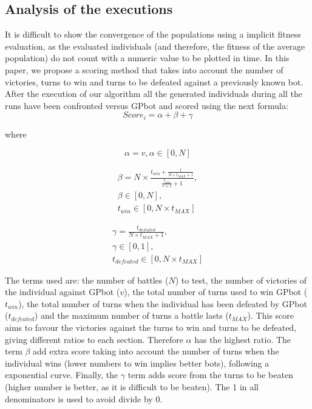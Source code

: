 \documentclass[conference]{IEEEtran}
\begin{document}
\subsection{Analysis of the executions}   %
\label{subsec:analysisexecutions}

It is difficult to show the convergence of the populations using a implicit fitness evaluation, as the evaluated individuals (and therefore, the fitness of the average population) do not count with a numeric value to be plotted in time. In this paper, we propose a scoring method that takes into account the number of victories, turns to win and turns to be defeated %
 against a previously known bot. After the execution of our algorithm all the generated individuals during all the runs have been confronted versus GPbot \cite{GarciaGP14} and scored using the next formula:
\begin{equation}
Score_{i}=\alpha+\beta+\gamma
\end{equation}

where

\begin{equation}
\alpha  = v, \alpha \in\left[0,N\right]
\end{equation}

\begin{equation}
\begin{split}
\beta =N\times\frac{t_{win}+\frac{1}{N\times t_{MAX}+1}}{\frac{t_{win}}{v+1}+1},\\
\beta \in\left[0,N\right], \\
t_{win} \in\left[0,N\times t_{MAX}\right]
\end{split}
\end{equation}

\begin{equation}
\begin{split}
\gamma  =\frac{t_{defeated}}{N \times t_{MAX}+1}, \\
\gamma \in\left[0,1\right], \\
t_{defeated} \in\left[0,N\times t_{MAX}\right]
\end{split}
\end{equation}

The terms used are: the number of battles ($N$) to test, the number of victories of the individual against GPbot ($v$), the total number of turns used to win GPbot ($t_{win}$), the total number of turns when the individual has been defeated by GPbot ($t_{defeated}$) and the maximum number of turns a battle lasts ($t_{MAX}$). This score aims to favour the victories against the turns to win and turns to be defeated, giving different ratios to each section. Therefore $\alpha$ has the highest ratio. The term $\beta$ add extra score taking into account the number of turns when the individual wins (lower numbers to win implies better bots), following a exponential curve.
Finally, the $\gamma$ term adds score from the turns to be beaten (higher number is better, as it is difficult to be beaten). The 1 in all denominators is used to avoid divide by 0.
\end{document}
